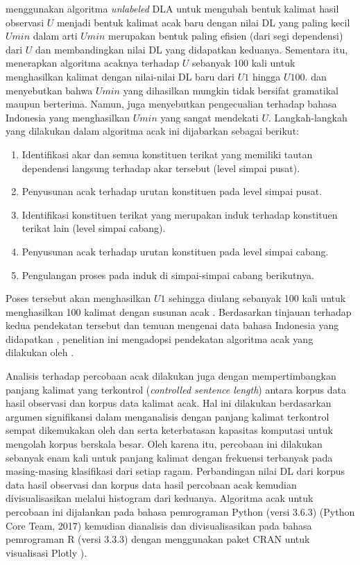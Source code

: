 \cite{gildea2010grammars} menggunakan algoritma \textit{unlabeled} DLA untuk mengubah bentuk kalimat hasil observasi $U$ menjadi bentuk kalimat acak baru dengan nilai DL yang paling kecil $Umin$ dalam arti $Umin$ merupakan bentuk paling efisien (dari segi dependensi) dari $U$ dan membandingkan nilai DL yang didapatkan keduanya. Sementara itu, \cite{futrell2015large} menerapkan algoritma acaknya terhadap $U$ sebanyak 100 kali untuk menghasilkan kalimat dengan nilai-nilai DL baru dari $U1$ hingga $U100$. \cite{futrell2015large} dan \cite{gildea2010grammars} menyebutkan bahwa $Umin$ yang dihasilkan mungkin tidak bersifat gramatikal maupun berterima. Namun, \cite{futrell2015large} juga menyebutkan pengecualian terhadap bahasa Indonesia yang menghasilkan $Umin$ yang sangat mendekati $U$. Langkah-langkah yang dilakukan dalam algoritma acak ini dijabarkan sebagai berikut:
\begin{enumerate}
\item Identifikasi akar dan semua konstituen terikat yang memiliki tautan dependensi langsung terhadap akar tersebut (level simpai pusat).
\item Penyusunan acak terhadap urutan konstituen pada level simpai pusat.
\item Identifikasi konstituen terikat yang merupakan induk terhadap konstituen terikat lain (level simpai cabang).
\item Penyusunan acak terhadap urutan konstituen pada level simpai cabang.
\item Pengulangan proses pada induk di simpai-simpai cabang berikutnya.
\end{enumerate}
Poses tersebut akan menghasilkan $U1$ sehingga diulang sebanyak 100 kali untuk menghasilkan 100 kalimat dengan susunan acak \citep{futrell2015large}. Berdasarkan tinjauan terhadap kedua pendekatan tersebut dan temuan mengenai data bahasa Indonesia yang didapatkan \cite{futrell2015large}, penelitian ini mengadopsi pendekatan algoritma acak yang dilakukan oleh \cite{futrell2015large}.

Analisis terhadap percobaan acak dilakukan juga dengan mempertimbangkan panjang kalimat yang terkontrol (\textit{controlled sentence length}) antara korpus data hasil observasi dan korpus data kalimat acak. Hal ini dilakukan berdasarkan argumen signifikansi dalam menganalisis dengan panjang kalimat terkontrol sempat dikemukakan oleh \cite{ferrer2014risks} dan \cite{jiang2015effects} serta keterbatasan kapasitas komputasi untuk mengolah korpus berskala besar. Oleh karena itu, percobaan ini dilakukan sebanyak enam kali untuk panjang kalimat dengan frekuensi terbanyak pada masing-masing klasifikasi dari setiap ragam. Perbandingan nilai DL dari korpus data hasil observasi dan korpus data hasil percobaan acak kemudian divisualisasikan melalui histogram dari keduanya. Algoritma acak untuk percobaan ini dijalankan pada bahasa pemrograman Python (versi 3.6.3) (Python Core Team, 2017) kemudian dianalisis dan divisualisasikan pada bahasa pemrograman R (versi 3.3.3) \citep{r2017project} dengan menggunakan paket CRAN untuk visualisasi Plotly \citep{sievert2017plotly}).

